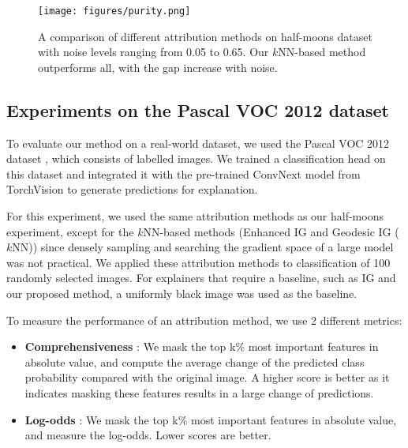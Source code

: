 \begin{figure}[h]
	\begin{center}
		\centerline{\texttt{[image: figures/purity.png]}}
		\caption{A comparison of different attribution methods on half-moons dataset with noise levels ranging from 0.05 to 0.65. Our $k$NN-based method outperforms all, with the gap increase with noise.}
		\label{fig:purity}
	\end{center}
	\vskip -0.3in
\end{figure}


\subsection{Experiments on the Pascal VOC 2012 dataset}
\label{subsec:voc}

To evaluate our method on a real-world dataset, we used the Pascal VOC 2012 dataset \citep{pascal-voc-2012}, which consists of labelled images. We trained a classification head on this dataset and integrated it with the pre-trained ConvNext model \citep{liu2022convnet} from TorchVision to generate predictions for explanation.

For this experiment, we used the same attribution methods as our half-moons experiment, except for the $k$NN-based methods (Enhanced IG and Geodesic IG ($k$NN)) since densely sampling and searching the gradient space of a large model was not practical. We applied these attribution methods to classification of 100 randomly selected images. For explainers that require a baseline, such as IG and our proposed method, a uniformly black image was used as the baseline.

To measure the performance of an attribution method, we use 2 different metrics:

\begin{itemize}
    \item \textbf{Comprehensiveness} \citep{deyoung2019eraser}: We mask the top k\% most important features in absolute value, and compute the average change of the predicted class probability compared with the original image. A higher score is better as it indicates masking these features results in a large change of predictions.

    \item \textbf{Log-odds} \citep{shrikumar2017learning}: We mask the top k\% most important features in absolute value, and measure the log-odds. Lower scores are better.
\end{itemize}

